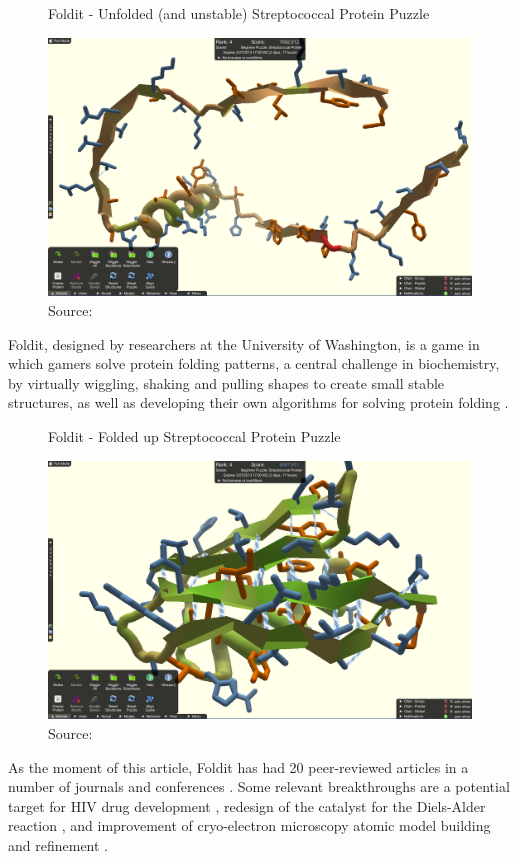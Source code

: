 \begin{figure}[ht]
    \centering
    \caption{Foldit - Unfolded (and unstable) Streptococcal Protein Puzzle}
    \includegraphics[width=0.8\linewidth]{images/background/foldit-problem.png}
    \caption*{Source: \cite{foldit-protein-problem}}
    \label{fig:foldit-problem}
\end{figure}

Foldit, designed by researchers at the University of Washington, is a game in which gamers solve protein folding patterns, a central challenge in biochemistry, by virtually wiggling, shaking and pulling shapes to create small stable structures, as well as developing their own algorithms for solving protein folding \cite{bourzac2008enlisting}. 

\begin{figure}[ht]
    \centering
    \caption{Foldit - Folded up Streptococcal Protein Puzzle}
    \includegraphics[width=0.8\linewidth]{images/background/foldit-solution.png}
    \caption*{Source: \cite{foldit-protein-solution}}
    \label{fig:foldit-solution}
\end{figure}

As the moment of this article, Foldit has had 20 peer-reviewed articles in a number of journals and conferences \cite{foldit2021publications}. Some relevant breakthroughs are a potential target for HIV drug development \cite{khatib2011crystal}, redesign of the catalyst for the Diels-Alder reaction \cite{eiben2012increased}, and improvement of cryo-electron microscopy atomic model building and refinement \cite{khatib2019building}.

